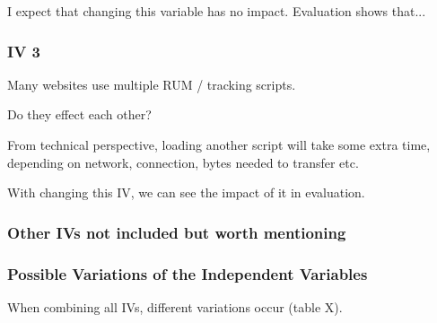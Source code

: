 I expect that changing this variable has no impact.
Evaluation shows that...




\subsubsection{IV 3}

Many websites use multiple RUM / tracking scripts.

Do they effect each other?

From technical perspective, loading another script will take some extra time, depending on network, connection, bytes needed to transfer etc.

With changing this IV, we can see the impact of it in evaluation.




\subsubsection{Other IVs not included but worth mentioning}




\subsubsection{Possible Variations of the Independent Variables}

When combining all IVs, different variations occur (table X).



